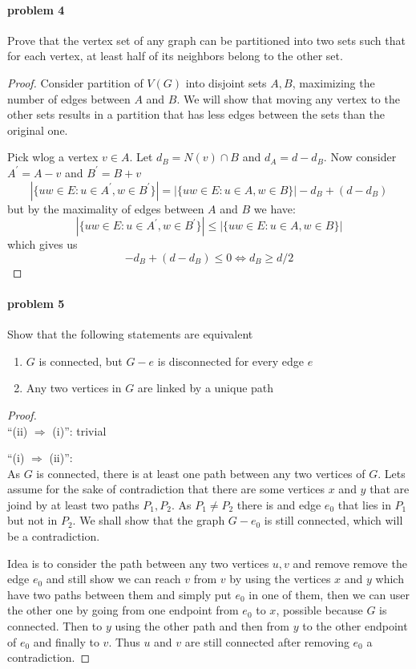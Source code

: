 \paragraph{problem 4}
Prove that the vertex set of any graph can be partitioned into two sets such that for
each vertex, at least half of its neighbors belong to the other set.
\begin{proof}
Consider partition of $ V(G) $ into disjoint sets $ A,B $, maximizing the number 
of edges between $ A $ and $ B $. We will show that moving any vertex to the other sets 
results in a partition that has less edges between the sets than the original one.

\smallskip \noindent
Pick wlog a vertex $ v \in A $. Let $ d_B = N(v) \cap B $ and $ d_A = d - d_B $.
Now consider $ A^\prime = A - v $ and $ B^\prime = B + v $
$$ |\{uw \in E: u \in A^\prime, w \in B^\prime\}| =
|\{uw \in E: u \in A, w \in B\}| - d_B + (d - d_B) $$
but by the maximality of edges between $ A $ and $ B $ we have:
$$|\{uw \in E: u \in A^\prime, w \in B^\prime\}| \leq 
|\{uw \in E: u \in A, w \in B\}|$$
which gives us 
$$ -d_B + (d - d_B) \leq 0 \iff d_B \geq d/2 $$ 
\end{proof}


\paragraph{problem 5}
Show that the following statements are equivalent
\begin{enumerate}
    \item $ G $ is connected, but $ G - e $ is disconnected for every edge $ e $
    \item Any two vertices in $ G $ are linked by a unique path
\end{enumerate}
\begin{proof} $ $ \\
    \enquote{(ii) $\Rightarrow$ (i)}: trivial

    \smallskip \noindent
    \enquote{(i) $\Rightarrow$ (ii)}: $ $ \\
    As $ G $ is connected, there is at least one path between any two vertices of $ G$.
    Lets assume for the sake of contradiction that there are some vertices $ x $ and 
    $ y $ that are joind by at least two paths $ P_1, P_2$. As $ P_1 \neq P_2 $ there 
    is and edge $ e_0 $ that lies in $ P_1 $ but not in $ P_2$. We shall show that 
    the graph $ G - e_0 $ is still connected, which will be a contradiction.

    \smallskip \noindent
    Idea is to consider the path between any two vertices $ u,v $ and remove remove 
    the edge $ e_0 $ and still show we can reach $ v $ from $ v $ by using 
    the vertices $ x $ and $ y $ which have two paths between them and simply put 
    $ e_0 $ in one of them, then we can user the other one by going from one endpoint 
    from $ e_0 $ to $ x $, possible because $ G $ is connected. Then to $ y $ using the 
    other path and then from $ y $ to the other endpoint of $ e_0 $ and finally to $ v $.
    Thus $ u $ and $ v $ are still connected after removing $ e_0 $ a contradiction. 

\end{proof}

